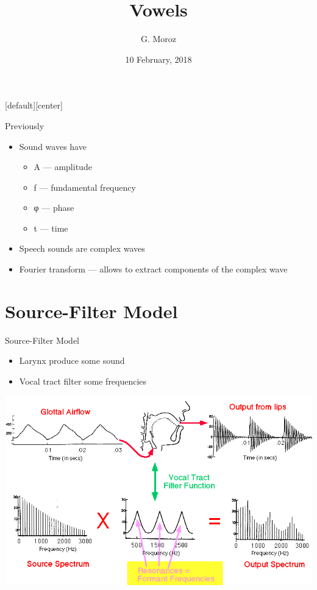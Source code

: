 [default][center]
\title[]{Vowels}
\author[]{G. Moroz}
\date{10 February, 2018}

\frame{\titlepage}

\begin{frame}{Previously}
\begin{itemize}
\item Sound waves have
\begin{itemize}
\item A --- amplitude
\item f --- fundamental frequency
\item φ --- phase
\item t --- time
\end{itemize}
\item Speech sounds are complex waves
\item Fourier transform --- allows to extract components of the complex wave
\end{itemize}
\end{frame}

\section{Source-Filter Model}
\begin{frame}{Source-Filter Model}
\begin{itemize}
\item Larynx produce some sound
\item Vocal tract filter some frequencies
\end{itemize}
\includegraphics[width=0.95\linewidth]{01-source-filter.png}
\end{frame}

